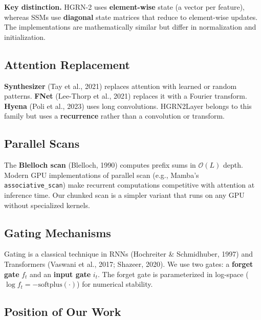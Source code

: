 \textbf{Key distinction.} HGRN-2 uses \textbf{element-wise} state (a vector per 
feature), whereas SSMs use \textbf{diagonal} state matrices that reduce to 
element-wise updates. The implementations are mathematically similar but 
differ in normalization and initialization.

\subsection{Attention Replacement}

\textbf{Synthesizer} (Tay et al., 2021) replaces attention with learned or 
random patterns. \textbf{FNet} (Lee-Thorp et al., 2021) replaces it with a 
Fourier transform. \textbf{Hyena} (Poli et al., 2023) uses long convolutions. 
HGRN2Layer belongs to this family but uses a \textbf{recurrence} rather than a 
convolution or transform.

\subsection{Parallel Scans}

The \textbf{Blelloch scan} (Blelloch, 1990) computes prefix sums in $\mathcal{O}(L)$ 
depth. Modern GPU implementations of parallel scan (e.g., Mamba's \texttt{associative\_scan}) 
make recurrent computations competitive with attention at inference time. Our 
chunked scan is a simpler variant that runs on any GPU without specialized 
kernels.

\subsection{Gating Mechanisms}

Gating is a classical technique in RNNs (Hochreiter \& Schmidhuber, 1997) and 
Transformers (Vaswani et al., 2017; Shazeer, 2020). We use two gates: a 
\textbf{forget gate} $f_t$ and an \textbf{input gate} $i_t$. The forget gate is 
parameterized in log-space ($\log f_t = -\text{softplus}(\cdot)$) for 
numerical stability.

\subsection{Position of Our Work}

